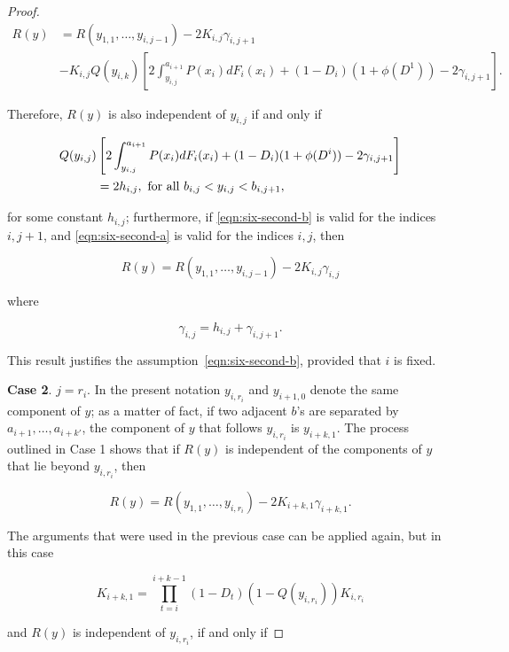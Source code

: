 \documentclass{article}
\begin{document}
\begin{proof}
\[
\begin{aligned}
R(y) &= R(y_{1, 1}, \dots, y_{i, j-1}) - 2K_{i, j} \gamma_{i, j+1} \\
&- K_{i, j} Q(y_{i, k}) \left [
2 \int_{y_{i, j}}^{a_{i+1}} P(x_i) dF_i(x_i) + (1-D_i)(1 + \phi(D^1)) - 2
\gamma_{i, j+1}
\right ].
\end{aligned}
\]

Therefore, $R(y)$ is also independent of $y_{i, j}$ if and only if

\begin{align}
Q(y_{i, j}) &
\left [
2 \int_{y_{i, j}}^{a_{i+1}} P(x_i) dF_i(x_i) + (1 - D_i) (1 + \phi(D^i)) -
2\gamma_{i, j+1}
\right ] \label{eqn:six-second-a} \\
&= 2h_{i, j}, \textup{ for all } b_{i, j} < y_{i, j} < b_{i, j+1}, \notag
\end{align}

for some constant $h_{i, j}$; furthermore, if \eqref{eqn:six-second-b} is valid
for the indices $i, j+1$, and \eqref{eqn:six-second-a} is valid for the indices
$i, j$, then

\[
R(y) = R(y_{1, 1}, \dots, y_{i, j-1}) - 2K_{i, j} \gamma_{i, j}
\]

where

\begin{equation}
\gamma_{i, j} = h_{i,j} + \gamma_{i, j+1}.
\end{equation}

This result justifies the assumption~\eqref{eqn:six-second-b}, provided that
$i$ is fixed.

\textbf{Case 2}. $j = r_i$. In the present notation $y_{i, r_i}$ and $y_{i+1,
0}$ denote the same component of $y$; as a matter of fact, if two adjacent
$b$'s are separated by $a_{i+1}, \dots, a_{i + k'}$, the component of $y$ that
follows $y_{i, r_i}$ is $y_{i+k, 1}$. The process outlined in Case 1 shows that
if $R(y)$ is independent of the components of $y$ that lie beyond $y_{i,
r_i}$, then

\[
R(y) = R(y_{1, 1}, \dots, y_{i, r_i}) - 2K_{i+k, 1} \gamma_{i+k, 1}.
\]

The arguments that were used in the previous case can be applied again, but in
this case

\[
K_{i+k, 1} = \prod_{t=i}^{i+k-1} (1 - D_t) (1 - Q(y_{i, r_i})) K_{i, r_i}
\]

and $R(y)$ is independent of $y_{i, r_i}$, if and only if



\end{proof}



\end{document}

